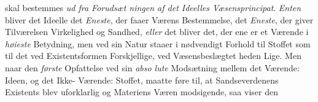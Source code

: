 skal bestemmes \emph{ud fra Forudsæt\-%
ningen af det Ideelles Væsensprincipat}. \emph{Enten} bliver
det Ideelle det \emph{Eneste}, der faaer Værens Bestemmelse, det
\emph{Eneste}, der giver Tilværelsen Virkelighed og Sandhed, \emph{eller}
det bliver det, der ene er et Værende i \emph{høieste} Betydning,
men ved sin Natur staaer i nødvendigt Forhold til Stoffet som
til det ved Existentsformen Forskjellige, ved Væsensbeslægtet\-%
heden Lige. Men naar den \emph{første} Opfattelse ved sin \emph{abso\-%
lute} Modsætning mellem det Værende: Ideen, og det Ikke-%
Værende: Stoffet, maatte føre til, at Sandseverdenens Existents
blev uforklarlig og Materiens Væren modsigende, saa viser den
